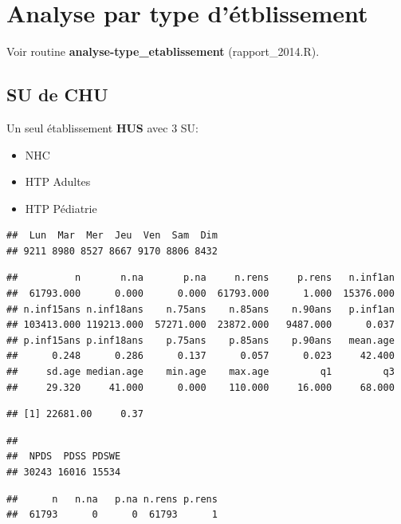 \documentclass[]{article}
\begin{document}
\section{Analyse par type
d'étblissement}\label{analyse-par-type-detblissement}

Voir routine \textbf{analyse-type\_etablissement} (rapport\_2014.R).

\subsection{SU de CHU}\label{su-de-chu}

Un seul établissement \textbf{HUS} avec 3 SU:

\begin{itemize}
\itemsep1pt\parskip0pt
\item
  NHC
\item
  HTP Adultes
\item
  HTP Pédiatrie
\end{itemize}

\begin{verbatim}
##  Lun  Mar  Mer  Jeu  Ven  Sam  Dim 
## 9211 8980 8527 8667 9170 8806 8432
\end{verbatim}

\begin{verbatim}
##          n       n.na       p.na     n.rens     p.rens   n.inf1an 
##  61793.000      0.000      0.000  61793.000      1.000  15376.000 
## n.inf15ans n.inf18ans    n.75ans    n.85ans    n.90ans   p.inf1an 
## 103413.000 119213.000  57271.000  23872.000   9487.000      0.037 
## p.inf15ans p.inf18ans    p.75ans    p.85ans    p.90ans   mean.age 
##      0.248      0.286      0.137      0.057      0.023     42.400 
##     sd.age median.age    min.age    max.age         q1         q3 
##     29.320     41.000      0.000    110.000     16.000     68.000
\end{verbatim}

\begin{verbatim}
## [1] 22681.00     0.37
\end{verbatim}

\begin{verbatim}
## 
##  NPDS  PDSS PDSWE 
## 30243 16016 15534
\end{verbatim}

\begin{verbatim}
##      n   n.na   p.na n.rens p.rens 
##  61793      0      0  61793      1
\end{verbatim}
\end{document}
